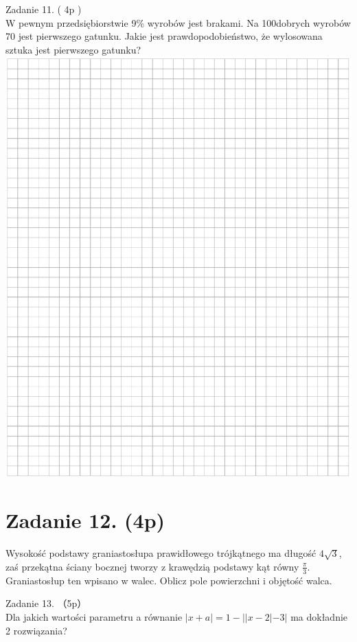 \documentclass[10pt]{article}
\begin{document}
Zadanie 11. ( 4p )\\
W pewnym przedsiębiorstwie 9\% wyrobów jest brakami. Na 100dobrych wyrobów 70 jest pierwszego gatunku. Jakie jest prawdopodobieństwo, że wylosowana sztuka jest pierwszego gatunku?\\
\includegraphics[max width=\textwidth, center]{2024_11_21_12a27a32a51fef2c834ag-08}

\section*{Zadanie 12. (4p)}
Wysokość podstawy graniastosłupa prawidłowego trójkątnego ma długość \(4 \sqrt{3}\), zaś przekątna ściany bocznej tworzy z krawędzią podstawy kąt równy \(\frac{\pi}{3}\). Graniastosłup ten wpisano w walec. Oblicz pole powierzchni i objętość walca.

Zadanie 13. （5p）\\
Dla jakich wartości parametru a równanie \(|x+a|=1-||x-2|-3|\) ma dokładnie 2 rozwiązania?
\end{document}
